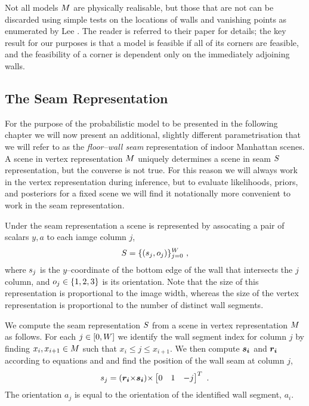 Not all models $\Scene$ are physically realisable, but those that are
not can be discarded using simple tests on the locations of walls and
vanishing points as enumerated by Lee \etal \cite{Lee09}. The reader
is referred to their paper for details; the key result for our
purposes is that a model is feasible if all of its corners are
feasible, and the feasibility of a corner is dependent only on the
immediately adjoining walls.

\subsection{The Seam Representation}
\label{sec:seam-representation}

For the purpose of the probabilistic model to be presented in the
following chapter we will now present an additional, slightly
different parametrisation that we will refer to as the
\textit{floor--wall seam} representation of indoor Manhattan scenes. A
scene in vertex representation $\Scene$ uniquely determines a scene in
seam $\Seam$ representation, but the converse is not true. For this
reason we will always work in the vertex representation during
inference, but to evaluate likelihoods, priors, and posteriors for a
fixed scene we will find it notationally more convenient to work in
the seam representation.

Under the seam representation a scene is represented by assocating a
pair of scalars $y,a$ to each iamge column $j$,
\begin{equation}
  \label{eqn:seam-def}
  \Seam = \{(\seam_j,\WallOrient_j)\}_{j=0}^\Width  ~,
\end{equation}
where $\seam_j$ is the $y$--coordinate of the bottom edge of the wall that
intersects the $j$\th column, and $\WallOrient_j\in\{1,2,3\}$ is its
orientation. Note that the size of this representation is proportional
to the image width, whereas the size of the vertex representation is
proportional to the number of distinct wall segments.

We compute the seam representation $\Seam$ from a scene in vertex
representation $\Scene$ as follows. For each $j\in[0,\Width]$ we
identify the wall segment index for column $j$ by finding
$x_i,x_{i+1}\in\Scene$ such that $x_i \leq j \leq x_{i+1}$. We then
compute $\vect{s_i}$ and $\vect{r_i}$ according to equations
 and  and find the position of the wall seam at
column $j$,
\begin{equation}
  \label{eqn:seam-from-scene}
  \seam_j = (\vect{r_i} \cross \vect{s_i}) \cross
  \begin{bmatrix} 0 & 1 & -j \end{bmatrix}^T ~.
\end{equation}
The orientation $a_j$ is equal to the orientation of the identified
wall segment, $a_i$.

